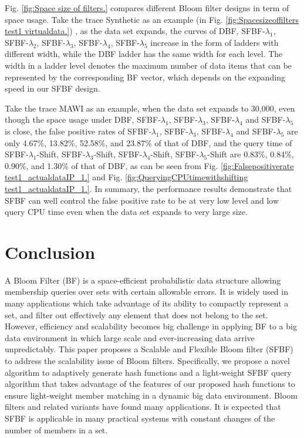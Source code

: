 \documentclass[10pt,journal,compsoc]{IEEEtran}
\begin{document}
Fig. \ref{fig:Space size of filters.} compares different Bloom filter designs in term of space usage.
Take the trace Synthetic as an example (in Fig. \ref{fig:Spacesizeoffilters test1 virtualdata.}) , as the data set expands, the curves of DBF, SFBF-$\lambda_1$, SFBF-$\lambda_2$, SFBF-$\lambda_3$, SFBF-$\lambda_4$, SFBF-$\lambda_5$ increase in the form of ladders with different width, while the DBF ladder has the same width for each level.
The width in a ladder level denotes the maximum number of data items that can be represented by the corresponding BF vector, which depends on the expanding speed in our SFBF design.

Take the trace MAWI as an example, when the data set expands to 30,000, even though the space usage under DBF, SFBF-$\lambda_1$,  SFBF-$\lambda_3$, SFBF-$\lambda_4$ and SFBF-$\lambda_5$ is close, the false positive rates of SFBF-$\lambda_1$,  SFBF-$\lambda_3$, SFBF-$\lambda_4$ and SFBF-$\lambda_5$ are only 4.67\%,  13.82\%, 52.58\%, and 23.87\% of that of DBF, and the query time of SFBF-$\lambda_1$-Shift,  SFBF-$\lambda_3$-Shift, SFBF-$\lambda_4$-Shift, SFBF-$\lambda_5$-Shift are 0.83\%, 0.84\%, 0.90\%, and 1.30\% of that of DBF, as can be seen from Fig. \ref{fig:Falsepositiverate test1_actualdataIP_1.} and Fig. \ref{fig:QueryingCPUtimewithshifting test1_actualdataIP_1.}.
In summary, the performance results demonstrate that SFBF can well control the false positive rate to be at very low level and low query CPU time even when the data set expands to very large size.




\section{Conclusion}
\label{sec:CONCLUSION}
A Bloom Filter (BF) is a space-efficient probabilistic data structure allowing membership queries over
sets with certain allowable errors. It is widely used in many applications which take advantage of
its ability to compactly represent a set, and filter out effectively any element that does not belong
to the set. However, efficiency and scalability becomes big challenge in applying BF to a big data environment in which large scale and ever-increasing data arrive unpredictably. This paper proposes a  Scalable and Flexible Bloom
filter (SFBF) to address the scalability issue of Bloom filters. Specifically, we propose a novel algorithm to adaptively generate hash functions and a light-weight SFBF query algorithm that takes advantage of the features of our proposed hash functions to ensure light-weight member matching in a dynamic big data environment. Bloom filters and related variants have found many applications. It is expected that SFBF is applicable in many practical systems with constant changes of the number of members in a set.
\end{document}
